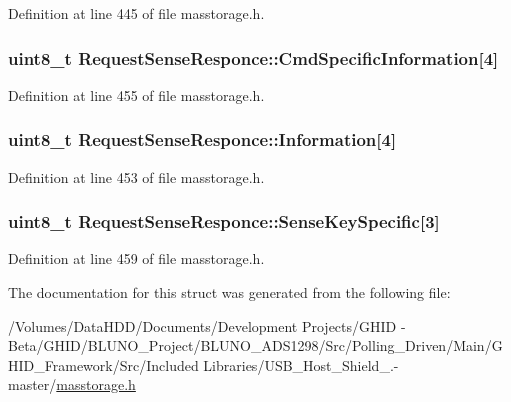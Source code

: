\-Definition at line 445 of file masstorage.\-h.

\hypertarget{struct_request_sense_responce_ab2f0cab24692ca29dffc231f31198726}{
\subsubsection[{\-Cmd\-Specific\-Information}]{\setlength{\rightskip}{0pt plus 5cm}uint8\-\_\-t {\bf \-Request\-Sense\-Responce\-::\-Cmd\-Specific\-Information}\mbox{[}4\mbox{]}}}\label{struct_request_sense_responce_ab2f0cab24692ca29dffc231f31198726}


\-Definition at line 455 of file masstorage.\-h.

\hypertarget{struct_request_sense_responce_a4342aa28405753a185d867060fec931e}{
\subsubsection[{\-Information}]{\setlength{\rightskip}{0pt plus 5cm}uint8\-\_\-t {\bf \-Request\-Sense\-Responce\-::\-Information}\mbox{[}4\mbox{]}}}\label{struct_request_sense_responce_a4342aa28405753a185d867060fec931e}


\-Definition at line 453 of file masstorage.\-h.

\hypertarget{struct_request_sense_responce_a61d034714befc2fa0fb7dcea30942324}{
\subsubsection[{\-Sense\-Key\-Specific}]{\setlength{\rightskip}{0pt plus 5cm}uint8\-\_\-t {\bf \-Request\-Sense\-Responce\-::\-Sense\-Key\-Specific}\mbox{[}3\mbox{]}}}\label{struct_request_sense_responce_a61d034714befc2fa0fb7dcea30942324}


\-Definition at line 459 of file masstorage.\-h.



\-The documentation for this struct was generated from the following file\-:\begin{DoxyCompactItemize}
\item 
/\-Volumes/\-Data\-H\-D\-D/\-Documents/\-Development Projects/\-G\-H\-I\-D -\/ Beta/\-G\-H\-I\-D/\-B\-L\-U\-N\-O\-\_\-\-Project/\-B\-L\-U\-N\-O\-\_\-\-A\-D\-S1298/\-Src/\-Polling\-\_\-\-Driven/\-Main/\-G\-H\-I\-D\-\_\-\-Framework/\-Src/\-Included Libraries/\-U\-S\-B\-\_\-\-Host\-\_\-\-Shield\-\_.-\/master/\hyperlink{masstorage_8h}{masstorage.\-h}\end{DoxyCompactItemize}
